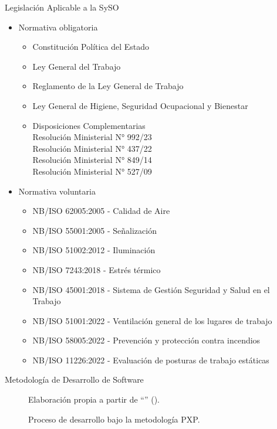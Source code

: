 \documentclass[spanish]{beamer} %
\begin{document}
\begin{frame}[allowframebreaks]{Legislación Aplicable a la SySO}
  \begin{itemize}
      \item Normativa obligatoria
      \begin{itemize}
          \item Constitución Política del Estado
          \item Ley General del Trabajo
          \item Reglamento de la Ley General de Trabajo
          \item Ley General de Higiene, Seguridad Ocupacional y Bienestar
          \item Disposiciones Complementarias\\ \quad Resolución Ministerial N° 992/23\\ \quad Resolución Ministerial N° 437/22\\ \quad Resolución Ministerial N° 849/14\\ \quad Resolución Ministerial N° 527/09
      \end{itemize}
      \framebreak
      \item Normativa voluntaria
      \begin{itemize}
          \item NB/ISO 62005:2005 - Calidad de Aire
          \item NB/ISO 55001:2005 - Señalización
          \item NB/ISO 51002:2012 - Iluminación
          \item NB/ISO 7243:2018 - Estrés térmico
          \item NB/ISO 45001:2018 - Sistema de Gestión Seguridad y Salud en el Trabajo
          \item NB/ISO 51001:2022 - Ventilación general de los lugares de trabajo
          \item NB/ISO 58005:2022 - Prevención y protección contra incendios
          \item NB/ISO 11226:2022 - Evaluación de posturas de trabajo estáticas
      \end{itemize}
  \end{itemize}
\end{frame}

\begin{frame}{Metodología de Desarrollo de Software}

  \begin{figure}
    \centering
    
      \caption{\footnotesize Proceso de desarrollo bajo la metodología PXP.}
      \scriptsize{{Elaboración propia a partir de ``\textit{}'' (\citeyear{dzhurov2009personal}).}}
    \label{fig:modelo_desarrollo_pxp} 
  \end{figure}

\end{frame}
\end{document}

